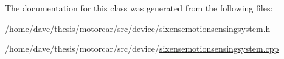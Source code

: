 The documentation for this class was generated from the following files\-:\begin{DoxyCompactItemize}
\item 
/home/dave/thesis/motorcar/src/device/\hyperlink{sixensemotionsensingsystem_8h}{sixensemotionsensingsystem.\-h}\item 
/home/dave/thesis/motorcar/src/device/\hyperlink{sixensemotionsensingsystem_8cpp}{sixensemotionsensingsystem.\-cpp}\end{DoxyCompactItemize}
